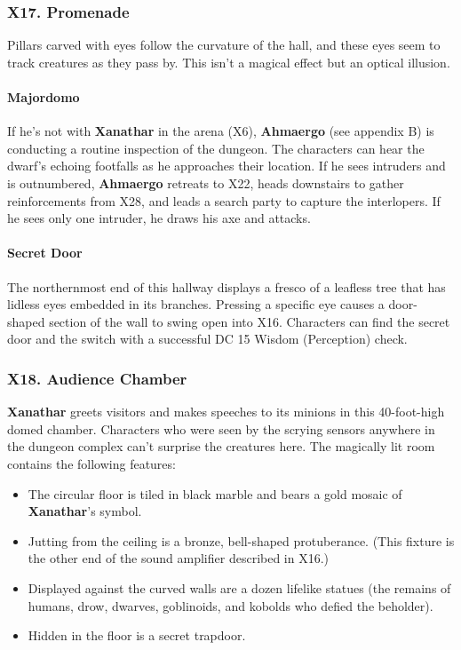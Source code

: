 \documentclass[10pt,a4paper,twoside,twocolumn,openany,nodeprecatedcode]{dndbook}
\begin{document}
\subsubsection{X17. Promenade}
Pillars carved with eyes follow the curvature of the hall, and these eyes seem to track creatures as they pass by. This isn't a magical effect but an optical illusion.
\paragraph{Majordomo}
If he's not with \textbf{Xanathar} in the arena (X6), \textbf{Ahmaergo} (see appendix B) is conducting a routine inspection of the dungeon. The characters can hear the dwarf's echoing footfalls as he approaches their location. If he sees intruders and is outnumbered, \textbf{Ahmaergo} retreats to X22, heads downstairs to gather reinforcements from X28, and leads a search party to capture the interlopers. If he sees only one intruder, he draws his axe and attacks.
\paragraph{Secret Door}
The northernmost end of this hallway displays a fresco of a leafless tree that has lidless eyes embedded in its branches. Pressing a specific eye causes a door-shaped section of the wall to swing open into X16. Characters can find the secret door and the switch with a successful DC 15 Wisdom (Perception) check.
\subsubsection{X18. Audience Chamber}
\textbf{Xanathar} greets visitors and makes speeches to its minions in this 40-foot-high domed chamber. Characters who were seen by the scrying sensors anywhere in the dungeon complex can't surprise the creatures here. The magically lit room contains the following features:
\begin{itemize}

\item The circular floor is tiled in black marble and bears a gold mosaic of \textbf{Xanathar}'s symbol.
\item Jutting from the ceiling is a bronze, bell-shaped protuberance. (This fixture is the other end of the sound amplifier described in X16.)
\item Displayed against the curved walls are a dozen lifelike statues (the remains of humans, drow, dwarves, goblinoids, and kobolds who defied the beholder).
\item Hidden in the floor is a secret trapdoor.
\end{itemize}
\end{document}
